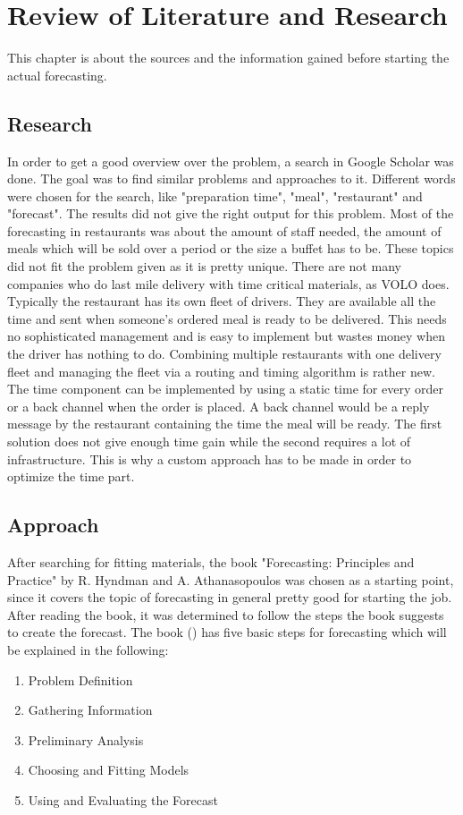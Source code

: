 \renewcommand{\thepage}{\arabic{page}}
\chapter{Review of Literature and Research}\label{chapter:Review of Literature and Research}
This chapter is about the sources and the information gained before starting the actual forecasting.
\section{Research}\label{section:Research}
In order to get a good overview over the problem, a search in Google Scholar was done. The goal was to find similar problems and approaches to it. Different words were chosen for the search, like "preparation time", "meal", "restaurant" and "forecast". The results did not give the right output for this problem. Most of the forecasting in restaurants was about the amount of staff needed, the amount of meals which will be sold over a period or the size a buffet has to
be. These topics did not fit the problem given as it is pretty unique. There are not many companies who do last mile delivery with time critical materials, as VOLO does. Typically the restaurant has its own fleet of drivers. They are available all the time and sent when someone's ordered meal is ready to be delivered. This needs no sophisticated management  and is easy to implement but wastes money when the driver has nothing to do. Combining multiple restaurants with one delivery fleet and managing the fleet via a routing and timing algorithm is rather new. The time component can be implemented by using a static time for every order or a back channel when the order is placed. A back channel would be a reply message by the restaurant containing the time the meal will be ready. The first solution does not give enough time gain while the second requires a lot of infrastructure. This is why a custom approach has to be made in order to optimize the time part.
\section{Approach}\label{section:Approach and Basics}
After searching for fitting materials, the book "Forecasting: Principles and Practice" by R. Hyndman and A. Athanasopoulos was chosen as a starting point, since it covers the topic of forecasting in general pretty good for starting the job. After reading the book, it was determined to follow the steps the book suggests to create the forecast. The book (\cite{Hyndman.2013}) has five basic steps for forecasting which will be explained in the following:
\newpage
\begin{enumerate}
\item Problem Definition
\item Gathering Information
\item Preliminary Analysis
\item Choosing and Fitting Models
\item Using and Evaluating the Forecast
\end{enumerate}


